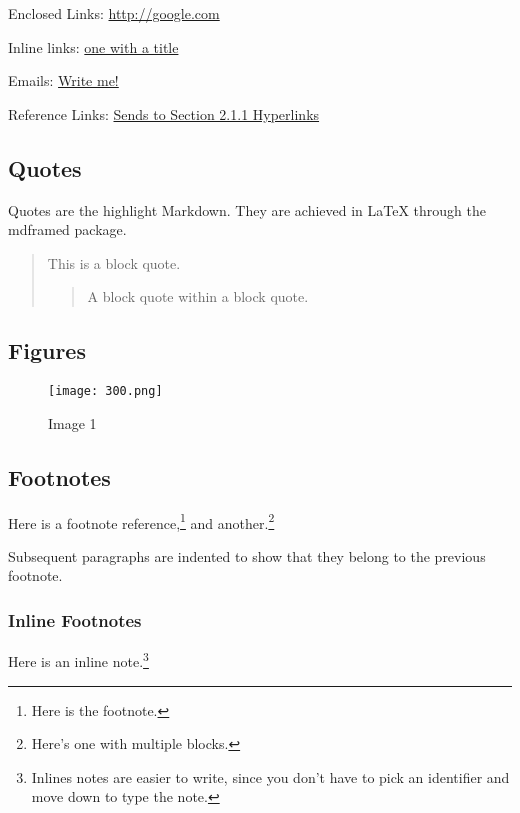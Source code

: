 \documentclass{web_article}
\begin{document}
Enclosed Links: \url{http://google.com}

Inline links: \href{http://fsf.org}{one with a title}

Emails: \href{mailto:sam@green.eggs.ham}{Write me!}

Reference Links: \protect\hyperlink{Hyperlinks}{Sends to Section 2.1.1
Hyperlinks}

\subsection{Quotes}\label{quotes}

Quotes are the highlight Markdown. They are achieved in LaTeX through
the mdframed package.

\begin{quote}
This is a block quote.

\begin{quote}
A block quote within a block quote.
\end{quote}
\end{quote}

\newpage

\subsection{Figures}\label{figures}

\begin{figure}
\centering
\texttt{[image: 300.png]}
\caption{Image 1}
\end{figure}

\newpage

\subsection{Footnotes}\label{footnotes}

Here is a footnote reference,\footnote{Here is the footnote.} and
another.\footnote{Here's one with multiple blocks.}

Subsequent paragraphs are indented to show that they belong to the
previous footnote.

\subsubsection{Inline Footnotes}\label{inline-footnotes}

Here is an inline note.\footnote{Inlines notes are easier to write,
  since you don't have to pick an identifier and move down to type the
  note.}
\end{document}
